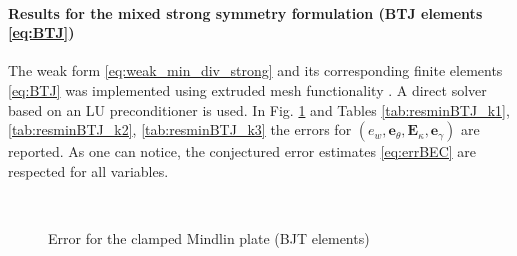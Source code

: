 \paragraph{Results for the mixed strong symmetry formulation (BTJ elements \eqref{eq:BTJ})} 

The weak form \eqref{eq:weak_min_div_strong} and its corresponding finite elements \eqref{eq:BTJ} was implemented using {} extruded mesh functionality \cite{mcrae2016}. A direct solver based on an LU preconditioner is used. In Fig. \ref{fig:errorBTJ} and Tables \ref{tab:resminBTJ_k1}, \ref{tab:resminBTJ_k2}, \ref{tab:resminBTJ_k3} the errors for $(e_w, \bm{e}_\theta, \bm{E}_\kappa, \bm{e}_\gamma)$ are reported. As one can notice, the conjectured error estimates \eqref{eq:errBEC} are respected for all variables. 

\begin{figure}[h]%
	\centering
	\hspace{8pt}%
	 \\
	\hspace{8pt}%
	\caption{Error for the clamped Mindlin plate (BJT elements)}%
	\label{fig:errorBTJ}%
\end{figure}


